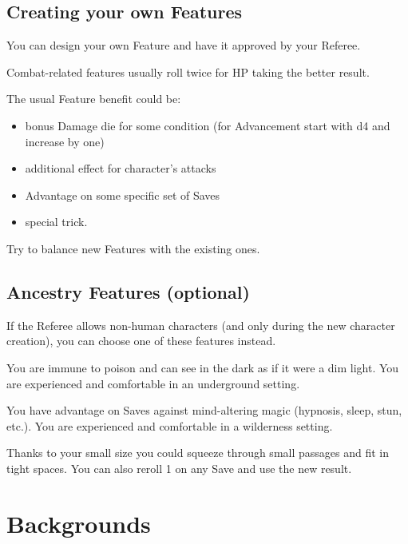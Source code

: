 \documentclass[itdr]{subfiles}
\begin{document}
\vfill
\break


\begin{dbox}
\subsection*{Creating your own Features}

You can design your own Feature and have it approved by your Referee.

Combat-related features usually roll twice for HP taking the better result.

The usual Feature benefit could be:
\begin{itemize}
	\item bonus Damage die for some condition (for Advancement start with d4 and increase by one)
	\item additional effect for character's attacks
	\item Advantage on some specific set of Saves
	\item special trick.
\end{itemize}

Try to balance new Features with the existing ones.
\end{dbox}

\subsection*{Ancestry Features (optional)}

If the Referee allows non-human characters (and only during the new character creation), you can choose one of these features instead.

You are immune to poison and can see in the dark as if it were a dim light. You are experienced and comfortable in an underground setting.

You have advantage on Saves against mind-altering magic (hypnosis, sleep, stun, etc.). You are experienced and comfortable in a wilderness setting.

Thanks to your small size you could squeeze through small passages and fit in tight spaces. You can also reroll 1 on any Save and use the new result.

\break


\section{Backgrounds}
\end{document}
